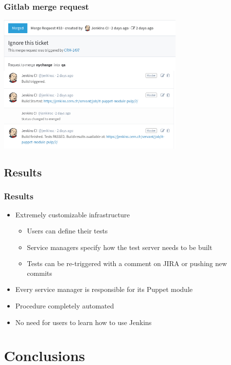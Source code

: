 \documentclass[aspectratio=169]{beamer}
\begin{document}

\begin{frame}
    \frametitle{Gitlab merge request}
    \centering
    \includegraphics[width=0.7\textwidth]{gitlab_merge_to_qa_final.jpg}
\end{frame}


\subsection{Results}
\begin{frame}
    \frametitle{Results}
    \begin{itemize}
        \item Extremely customizable infrastructure
        \begin{itemize}
            \item Users can define their tests
            \item Service managers specify how the test server needs to be built
            \item Tests can be re-triggered with a comment on JIRA or pushing new commits
        \end{itemize}
        \item Every service manager is responsible for its Puppet module
        \item Procedure completely automated
        \item No need for users to learn how to use Jenkins
    \end{itemize}
\end{frame}

\section{Conclusions}
\end{document}
